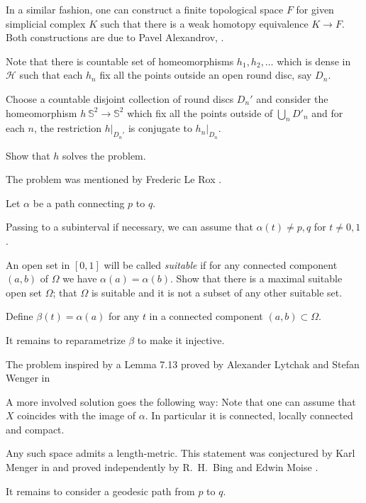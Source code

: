 In a similar fashion, one can construct a finite topological space $F$ for given simplicial complex $K$ 
such that 
there is a weak homotopy equivalence $K\to F$.
Both constructions are due to Pavel Alexandrov, 
\cite[see][]{alexandrov-finite,mccord}.

Note that there is countable set of homeomorphisms $h_1,h_2,\dots$ which is dense in $\mathcal{H}$
such that
each $h_n$ fix all the points outside an open round disc, say $D_n$.

Choose a countable disjoint collection of round discs $D_n'$
and consider the homeomorphism $h\:\mathbb S^2\to \mathbb S^2$
which fix all the points outside of $\bigcup_nD'_n$ and
for each $n$,
the restriction $h|_{D_n'}$ is conjugate to $h_n|_{D_n}$. 

Show that $h$ solves the problem.
\qeds

The problem was mentioned by Frederic Le Rox \cite[see][]{rox}.

Let $\alpha$ be a path connecting $p$ to $q$.

Passing to a subinterval if necessary,
we can assume that $\alpha(t)\ne p,q$ for $t\ne0,1$.

An open set in $[0,1]$ will be called {}\emph{suitable}
if for any connected component $(a,b)$ of $\Omega$ we have $\alpha(a)=\alpha(b)$.
Show that there is a maximal suitable open set $\Omega$;
that $\Omega$ is suitable and it is not a subset of any other suitable set.

Define $\beta(t)=\alpha(a)$ for any $t$ in a connected component $(a,b)\subset\Omega$.

It remains to reparametrize $\beta$ to make it injective.
\qeds

The problem inspired by a Lemma 7.13 
proved by 
Alexander Lytchak
and Stefan Wenger in \cite{lytchak-wenger}

A more involved solution goes the following way:
Note that one can assume that $X$ coincides with the image of $\alpha$.
In particular it is connected, locally connected and compact.

Any such space admits a length-metric.
This statement was conjectured by Karl Menger in \cite{menger}
and proved independently 
by R.~H.~Bing  \cite[see][]{bing-length-0, bing-length-1} 
and Edwin Moise \cite[see][]{moise}.

It remains to consider a geodesic path from $p$ to $q$.